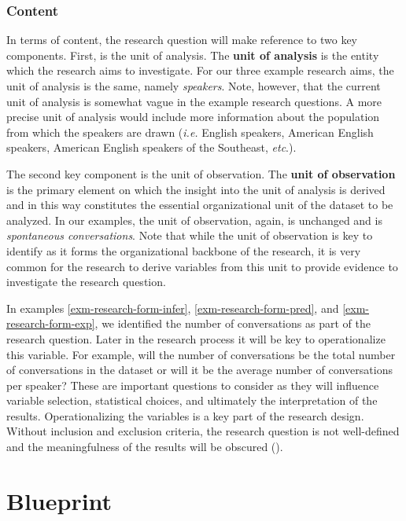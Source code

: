 \documentclass[
  letterpaper,
  krantz1]{latex/krantz-mod}
\theoremstyle{definition}
\theoremstyle{definition}
\theoremstyle{remark}
\begin{document}
\subsubsection{Content}\label{sec-research-question-content}

In terms of content, the research question will make reference to two
key components. First, is the unit of analysis. The \textbf{unit of
analysis} is the entity which the research aims to investigate. For our
three example research aims, the unit of analysis is the same, namely
\emph{speakers}. Note, however, that the current unit of analysis is
somewhat vague in the example research questions. A more precise unit of
analysis would include more information about the population from which
the speakers are drawn (\emph{i.e.} English speakers, American English
speakers, American English speakers of the Southeast, \emph{etc}.).

The second key component is the unit of observation. The \textbf{unit of
observation} is the primary element on which the insight into the unit
of analysis is derived and in this way constitutes the essential
organizational unit of the dataset to be analyzed. In our examples, the
unit of observation, again, is unchanged and is \emph{spontaneous
conversations}. Note that while the unit of observation is key to
identify as it forms the organizational backbone of the research, it is
very common for the research to derive variables from this unit to
provide evidence to investigate the research question.

In examples \ref{exm-research-form-infer}, \ref{exm-research-form-pred},
and \ref{exm-research-form-exp}, we identified the number of
conversations as part of the research question. Later in the research
process it will be key to operationalize this variable. For example,
will the number of conversations be the total number of conversations in
the dataset or will it be the average number of conversations per
speaker? These are important questions to consider as they will
influence variable selection, statistical choices, and ultimately the
interpretation of the results. Operationalizing the variables is a key
part of the research design. Without inclusion and exclusion criteria,
the research question is not well-defined and the meaningfulness of the
results will be obscured ().

\section{Blueprint}\label{sec-research-blueprint}
\end{document}
